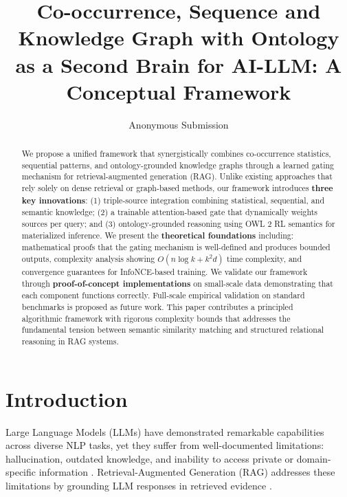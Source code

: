\documentclass[10pt,twocolumn]{article}
\title{Co-occurrence, Sequence and Knowledge Graph with Ontology as a Second Brain for AI-LLM: A Conceptual Framework}
\author{Anonymous Submission}
\date{}
\begin{document}
\maketitle

\begin{abstract}
We propose a unified framework that synergistically combines co-occurrence statistics, sequential patterns, and ontology-grounded knowledge graphs through a learned gating mechanism for retrieval-augmented generation (RAG). Unlike existing approaches that rely solely on dense retrieval or graph-based methods, our framework introduces \textbf{three key innovations}: (1) triple-source integration combining statistical, sequential, and semantic knowledge; (2) a trainable attention-based gate that dynamically weights sources per query; and (3) ontology-grounded reasoning using OWL 2 RL semantics for materialized inference. We present the \textbf{theoretical foundations} including: mathematical proofs that the gating mechanism is well-defined and produces bounded outputs, complexity analysis showing $O(n \log k + k^2 d)$ time complexity, and convergence guarantees for InfoNCE-based training. We validate our framework through \textbf{proof-of-concept implementations} on small-scale data demonstrating that each component functions correctly. Full-scale empirical validation on standard benchmarks is proposed as future work. This paper contributes a principled algorithmic framework with rigorous complexity bounds that addresses the fundamental tension between semantic similarity matching and structured relational reasoning in RAG systems.
\end{abstract}

\section{Introduction}

Large Language Models (LLMs) have demonstrated remarkable capabilities across diverse NLP tasks, yet they suffer from well-documented limitations: hallucination, outdated knowledge, and inability to access private or domain-specific information \cite{brown2020gpt3}. Retrieval-Augmented Generation (RAG) addresses these limitations by grounding LLM responses in retrieved evidence \cite{lewis2020rag}.
\end{document}
